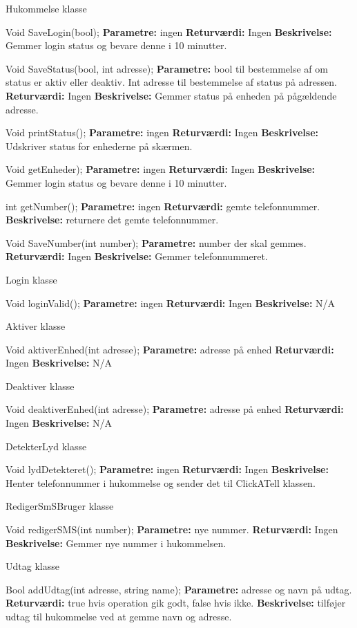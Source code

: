 {\centering Hukommelse klasse}

Void SaveLogin(bool);
\textbf{Parametre:} ingen 
\textbf{Returværdi:} Ingen
\textbf{Beskrivelse:} Gemmer login status og bevare denne i 10 minutter.

Void SaveStatus(bool, int adresse);
\textbf{Parametre:} bool til bestemmelse af om status er aktiv eller deaktiv. Int adresse til bestemmelse af status på adressen.
\textbf{Returværdi:} Ingen
\textbf{Beskrivelse:} Gemmer status på enheden på pågældende adresse.

Void printStatus();
\textbf{Parametre:} ingen 
\textbf{Returværdi:} Ingen
\textbf{Beskrivelse:} Udskriver status for enhederne på skærmen.

Void getEnheder);
\textbf{Parametre:} ingen 
\textbf{Returværdi:} Ingen
\textbf{Beskrivelse:} Gemmer login status og bevare denne i 10 minutter.

int getNumber();
\textbf{Parametre:} ingen 
\textbf{Returværdi:} gemte telefonnummer.
\textbf{Beskrivelse:} returnere det gemte telefonnummer.

Void SaveNumber(int number);
\textbf{Parametre:} number der skal gemmes.
\textbf{Returværdi:} Ingen
\textbf{Beskrivelse:} Gemmer telefonnummeret.

{\centering Login klasse}

Void loginValid();
\textbf{Parametre:} ingen 
\textbf{Returværdi:} Ingen
\textbf{Beskrivelse:} N/A

{\centering Aktiver klasse}

Void aktiverEnhed(int adresse);
\textbf{Parametre:} adresse på enhed 
\textbf{Returværdi:} Ingen
\textbf{Beskrivelse:} N/A

{\centering Deaktiver klasse}

Void deaktiverEnhed(int adresse);
\textbf{Parametre:} adresse på enhed
\textbf{Returværdi:} Ingen
\textbf{Beskrivelse:} N/A

{\centering DetekterLyd klasse}

Void lydDetekteret();
\textbf{Parametre:} ingen 
\textbf{Returværdi:} Ingen
\textbf{Beskrivelse:} Henter telefonnummer i hukommelse og sender det til ClickATell klassen.

{\centering RedigerSmSBruger klasse}

Void redigerSMS(int number);
\textbf{Parametre:} nye nummer.
\textbf{Returværdi:} Ingen
\textbf{Beskrivelse:} Gemmer nye nummer i hukommelsen.

{\centering Udtag klasse}

Bool addUdtag(int adresse, string name);
\textbf{Parametre:} adresse og navn på udtag.
\textbf{Returværdi:} true hvis operation gik godt, false hvis ikke.
\textbf{Beskrivelse:} tilføjer udtag til hukommelse ved at gemme navn og adresse.

